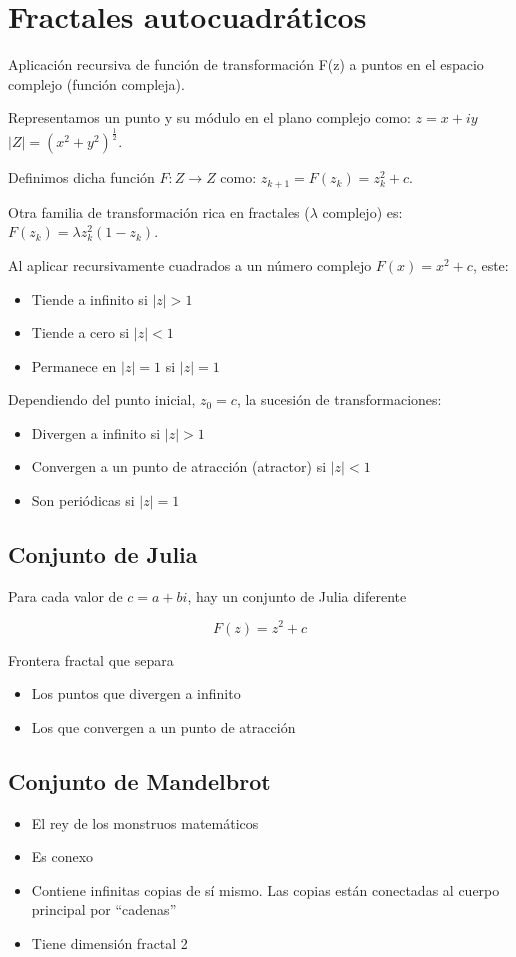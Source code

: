 \section{Fractales autocuadráticos}
Aplicación recursiva de función de transformación F(z) a puntos en el
espacio complejo (función compleja).

Representamos un punto y su módulo en el plano complejo como: $z=x+iy$ $|Z|=(x^2+y^2)^{\frac{1}{2}}$.

Definimos dicha función $F:Z \rightarrow Z$ como: $z_{k+1}=F(z_k)=z^2_k + c$.

Otra familia de transformación rica en fractales ($\lambda$ complejo) es: $F(z_k)=\lambda z^2_k(1-z_k)$.

Al aplicar recursivamente cuadrados a un número complejo $F(x)=x^2+c$, este:
\begin{itemize}
    \item Tiende a infinito si $|z|>1$
    \item Tiende a cero si $|z|<1$
    \item Permanece en $|z|=1$ si $|z|=1$
\end{itemize}

Dependiendo del punto inicial, $z_0 = c$, la sucesión de transformaciones:
\begin{itemize}
    \item Divergen a infinito si $|z|>1$
    \item Convergen a un punto de atracción (atractor) si $|z|<1$
    \item Son periódicas si $|z|=1$
\end{itemize}

\subsection{Conjunto de Julia}
Para cada valor de $c = a + bi$, hay un conjunto de Julia diferente

$$F(z)=z^2+c$$

Frontera fractal que separa
\begin{itemize}
    \item Los puntos que divergen a infinito
    \item Los que convergen a un punto de atracción
\end{itemize}

\subsection{Conjunto de Mandelbrot}
\begin{itemize}
    \item El rey de los monstruos matemáticos
    \item Es conexo
    \item Contiene infinitas copias de sí mismo. Las copias están conectadas al cuerpo principal por “cadenas”
    \item Tiene dimensión fractal 2
\end{itemize}

